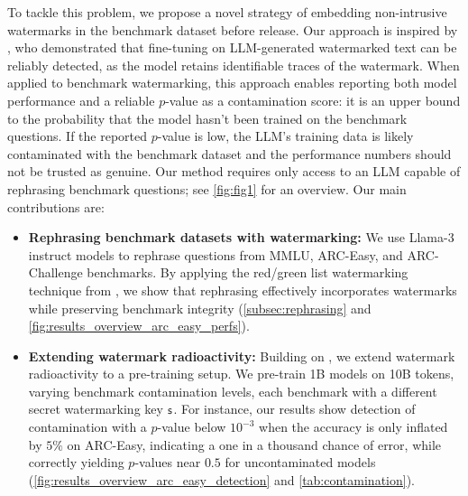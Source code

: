 To tackle this problem, we propose a novel strategy of embedding non-intrusive watermarks in the benchmark dataset before release. 
Our approach is inspired by \citet{sander2024watermarking}, who demonstrated that fine-tuning on LLM-generated watermarked text can be reliably detected, as the model retains identifiable traces of the watermark.
When applied to benchmark watermarking, this approach enables reporting both model performance and a reliable $p$-value as a contamination score: it is an upper bound to the probability that the model hasn't been trained on the benchmark questions. 
If the reported $p$-value is low, the LLM's training data is likely contaminated with the benchmark dataset and the performance numbers should not be trusted as genuine.
Our method requires only access to an LLM capable of rephrasing benchmark questions; see \autoref{fig:fig1} for an overview.
Our main contributions are:

\begin{itemize}[leftmargin=*]
    \item \textbf{Rephrasing benchmark datasets with watermarking:} We use Llama-3 instruct models to rephrase questions from MMLU, ARC-Easy, and ARC-Challenge benchmarks. By applying the red/green list watermarking technique from \citet{kirchenbauer2023watermark}, we show that rephrasing effectively incorporates watermarks while preserving benchmark integrity (\autoref{subsec:rephrasing} and \autoref{fig:results_overview_arc_easy_perfs}).
    \item \textbf{Extending watermark radioactivity:} Building on \citet{sander2024watermarking}, we extend watermark radioactivity to a pre-training setup. 
    We pre-train 1B models on 10B tokens, varying benchmark contamination levels, each benchmark with a different secret watermarking key $\mathsf{s}$.
    For instance, our results show detection of contamination with a $p$-value below $10^{-3}$ when the accuracy is only inflated by $5\%$ on ARC-Easy, indicating a one in a thousand chance of error, while correctly yielding $p$-values near $0.5$ for uncontaminated models (\autoref{fig:results_overview_arc_easy_detection} and \autoref{tab:contamination}).
\end{itemize}



